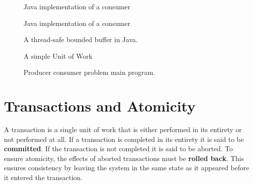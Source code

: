 \documentclass[10pt,a4paper]{article}
\begin{document}
\begin{figure}
\caption{Java implementation of a consumer}
\begin{center}

\label{jconsumer}
\end{center}
\end{figure}

\begin{figure}
\caption{Java implementation of a consumer}
\begin{center}

\label{jproducer}
\end{center}
\end{figure}

\begin{figure}
\caption{A thread-safe bounded buffer in Java.}
\begin{center}

\label{jqueue}
\end{center}
\end{figure}

\begin{figure}
\caption{A simple Unit of Work}
\begin{center}

\label{junit}
\end{center}
\end{figure}

\begin{figure}
\caption{Producer consumer problem main program.}
\begin{center}

\label{jprodconsumer}
\end{center}
\end{figure}

\section{Transactions and Atomicity}
A transaction is a single unit of work that is either performed in its entirety or not performed at all. If a transaction is completed in its entirety it is said to be {\bf committed}. If the transaction is not completed it is said to be aborted. To ensure atomicity, the effects of aborted transactions must be {\bf rolled back}. This ensures consistency by leaving the system in the same state as it appeared before it entered the transaction.  
\end{document}
